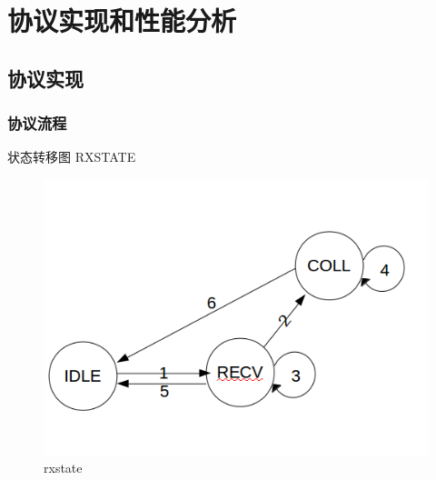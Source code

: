\chapter{协议实现和性能分析}
\section {协议实现}
\subsection{协议流程}

状态转移图
RXSTATE

 \begin{figure}[!ht]
 	\centering
 	\includegraphics[scale=0.5]{figures/rxstate.png}
 	\caption{
 		rxstate
 	}
 	\label{fig:example}
 \end{figure}
 
